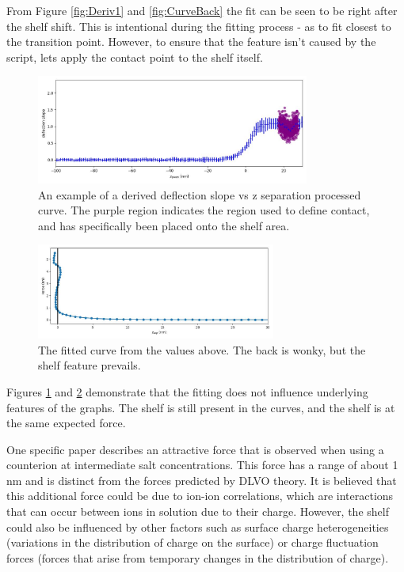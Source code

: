 From Figure \ref{fig:Deriv1} and \ref{fig:CurveBack} the fit can be seen to be right after the shelf shift. This is intentional during the fitting process - as to fit closest to the transition point. However, to ensure that the feature isn't caused by the script, lets apply the contact point to the shelf itself.

\begin{figure}[h!]
\centering
\includegraphics[width=0.8\textwidth]{chapter8/Shelf/Targeted df_deriv_bin.jpg}
\caption{An example of a derived deflection slope vs z separation processed curve. The purple region indicates the region used to define contact, and has specifically been placed onto the shelf area.}
\label{fig:Deriv2}
\end{figure}
\begin{figure}[h!]
\centering
\includegraphics[width=0.7\textwidth]{chapter8/Shelf/Targeted approach_force_sep.jpg}
\caption{The fitted curve from the values above. The back is wonky, but the shelf feature prevails.}
\label{fig:CurveBack2}
\end{figure}

Figures \ref{fig:Deriv2} and \ref{fig:CurveBack2} demonstrate that the fitting does not influence underlying features of the graphs. The shelf is still present in the curves, and the shelf is at the same expected force.

One specific paper describes an attractive force that is observed when using a counterion at intermediate salt concentrations. This force has a range of about 1 nm and is distinct from the forces predicted by DLVO theory. It is believed that this additional force could be due to ion-ion correlations, which are interactions that can occur between ions in solution due to their charge. However, the shelf could also be influenced by other factors such as surface charge heterogeneities (variations in the distribution of charge on the surface) or charge fluctuation forces (forces that arise from temporary changes in the distribution of charge). \cite{Valmacco2016}

